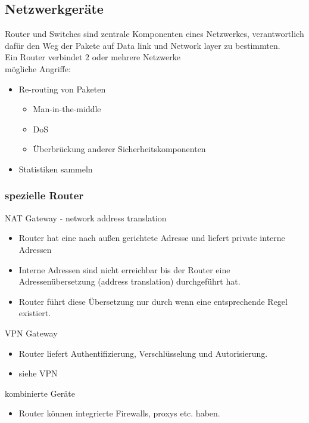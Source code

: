 \documentclass{article} %
\begin{document}
\subsection{Netzwerkgeräte}
Router und Switches sind zentrale Komponenten eines Netzwerkes, verantwortlich dafür den Weg der Pakete auf Data link und Network layer zu bestimmten.\\
Ein Router verbindet 2 oder mehrere Netzwerke\\
mögliche Angriffe:
\begin{itemize}
	\item Re-routing von Paketen
    
    \begin{itemize}
        \item Man-in-the-middle
        \item DoS
        \item Überbrückung anderer Sicherheitskomponenten
    \end{itemize}
    \item Statistiken sammeln
\end{itemize}
\subsubsection{spezielle Router}
NAT Gateway - network address translation
\begin{itemize}
	\item Router hat eine nach außen gerichtete Adresse und liefert private interne Adressen
    \item Interne Adressen sind nicht erreichbar bis der Router eine Adressenübersetzung (address translation) durchgeführt hat.
    \item Router führt diese Übersetzung nur durch wenn eine entsprechende Regel existiert.
\end{itemize}
VPN Gateway 
\begin{itemize}
	\item Router liefert Authentifizierung, Verschlüsselung und Autorisierung.
    \item siehe VPN
\end{itemize}
kombinierte Geräte
\begin{itemize}
	\item Router können integrierte Firewalls, proxys etc. haben.
\end{itemize}
\end{document}
